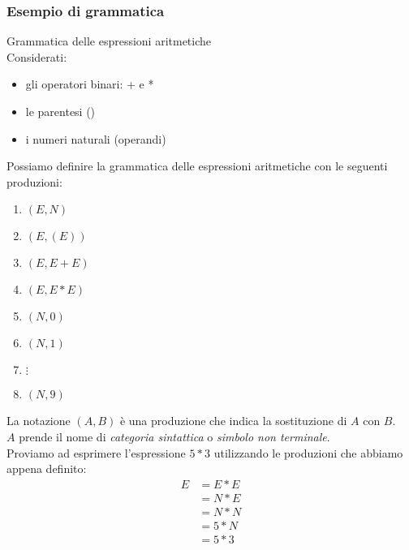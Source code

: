 \documentclass{article}
\begin{document}
\subsubsection{Esempio di grammatica}
\begin{eg}{Grammatica delle espressioni aritmetiche}\\
    Considerati:
    \begin{itemize}
        \item gli operatori binari: + e *
        \item le parentesi ()
        \item i numeri naturali (operandi)
    \end{itemize}
    Possiamo definire la grammatica delle espressioni aritmetiche con le seguenti produzioni:
    \begin{enumerate}
        \item \(\left( E, N \right)\)
        \item \(\left( E, \left(E\right) \right)\)
        \item \(\left( E, E + E \right)\)
        \item \(\left( E, E * E \right)\)
        \item \(\left( N, 0 \right)\)
        \item \(\left( N, 1 \right)\)
        \item \(\vdots\)
        \item \(\left( N, 9 \right)\)
    \end{enumerate}
    La notazione \(\left(A, B\right)\) è una produzione che indica la sostituzione di \(A\) con \(B\). \\
    \(A\) prende il nome di \emph{categoria sintattica} o \emph{simbolo non terminale}. \\
    Proviamo ad esprimere l'espressione \(5 * 3\) utilizzando le produzioni che abbiamo appena definito:
    \begin{align*}
        E & = E * E \\
          & = N * E \\
          & = N * N \\
          & = 5 * N \\
          & = 5 * 3
    \end{align*}
\end{eg}
\end{document}
